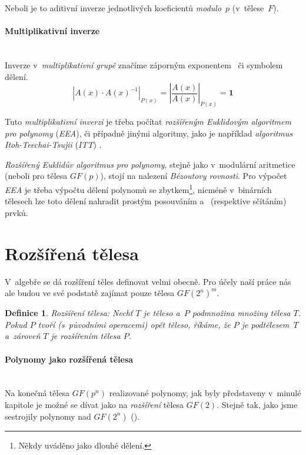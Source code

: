 \documentclass[thesis=M,czech,hidelinks]{FITthesis}[2012/06/26]
\newcommand{\0}{{\textcolor[gray]{0.75}{0}}}
\newtheorem{definice}{Definice}
\begin{document}
Neboli je to aditivní inverze jednotlivých koeficientů \emph{modulo}~$p$
(v~tělese~$F$).


\paragraph{Multiplikativní inverze} \hfil \\
Inverze v~\emph{multiplikativní grupě} značíme záporným exponentem~
či symbolem dělení.
$$
    \left| A(x) \cdot A(x)^{-1} \right|_{P(x)} =
    \left| \frac{A(x)}{A(x)} \right|_{P(x)} =
    \mathbf{1}
$$

Tuto \emph{multiplikativní inverzi} je třeba počítat \emph{rozšířeným Euklidovým
algoritmem pro polynomy} (\emph{EEA}), či případně jinými algoritmy, jako je
například \emph{algoritmus Itoh-Teechai-Tsujii} (\emph{ITT}) \cite{FIT_BHW,ITT}.

\emph{Rozšířený Euklidův algoritmus} \emph{pro polynomy}, stejně jako
v~modulární aritmetice (neboli pro tělesa $GF(p)$), stojí na nalezení
\emph{Bézoutovy rovnosti}. Pro výpočet \emph{EEA} je třeba výpočtu dělení
polynomů se zbytkem\footnote{
    Někdy uváděno jako dlouhé dělení.
}, nicméně v~binárních tělesech lze toto dělení nahradit prostým posouváním
a~ (respektive sčítáním) prvků.



\section{Rozšířená tělesa}
V~algebře se dá rozšíření těles definovat velmi obecně. Pro účely naší práce
nás ale budou ve své podstatě zajímat pouze tělesa $GF(2^n)^m$.

\begin{definice}{Rozšíření tělesa:}
    Nechť $T$ je těleso a~$P$ podmnožina množiny tělesa $T$. Pokud $P$ tvoří
    (s~původními operacemi) opět těleso, říkáme, že $P$ je \emph{podtělesem}~$T$
    a~zároveň $T$ je \emph{rozšířením} tělesa $P$.
\end{definice}


\paragraph{Polynomy jako rozšířená tělesa} \hfil \\
Na konečná tělesa $GF(p^n)$ realizované polynomy, jak byly představeny v~minulé
kapitole je možné se dívat jako na \emph{rozšíření} tělesa $GF(2)$. Stejně tak,
jako jsme sestrojily polynomy nad $GF(2^n)$ ().
\end{document}

